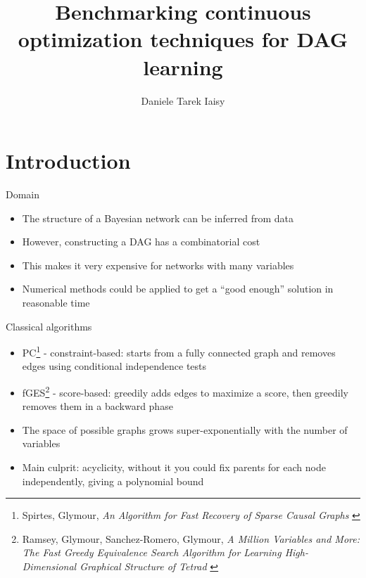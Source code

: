 \documentclass[aspectratio=169]{beamer}
\title{Benchmarking continuous optimization techniques for DAG learning}
\author{Daniele Tarek Iaisy}
\institute{Master's Degree in Artificial Intelligence, University of Bologna}
\date{}
\begin{document}
\maketitle

\section{Introduction}

\begin{frame}{Domain}
    \begin{itemize}
        \item The structure of a Bayesian network can be inferred from data
        \item However, constructing a DAG has a combinatorial cost
        \item This makes it very expensive for networks with many variables
        \item Numerical methods could be applied to get a ``good enough'' solution in reasonable time
    \end{itemize}
\end{frame}

\begin{frame}{Classical algorithms}
    \begin{itemize}
        \item PC\footnote{Spirtes, Glymour, \emph{An Algorithm for Fast Recovery of Sparse Causal Graphs} \cite{spirtes1991pc}} - constraint-based: starts from a fully connected graph and removes edges using conditional independence tests
        \item fGES\footnote{Ramsey, Glymour, Sanchez-Romero, Glymour, \emph{A Million Variables and More: The Fast Greedy Equivalence Search Algorithm for Learning High-Dimensional Graphical Structure of Tetrad} \cite{ramsey2017fges}} - score-based: greedily adds edges to maximize a score, then greedily removes them in a backward phase
        \item The space of possible graphs grows super-exponentially with the number of variables
        \item Main culprit: acyclicity, without it you could fix parents for each node independently, giving a polynomial bound
    \end{itemize}
\end{frame}
\end{document}
